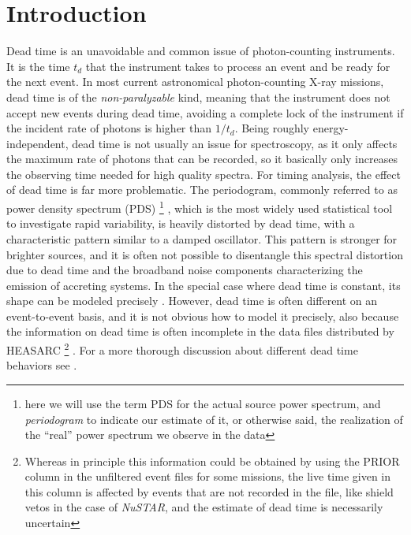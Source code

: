 \documentclass[twocolumn]{aastex61}
\newcommand{\project}[1]{\textsl{#1}}
\newcommand{\nustar}{\project{NuSTAR}\xspace}
\newcommand{\deadt}{\ensuremath{t_d}\xspace}
\begin{document}
\section{Introduction} \label{sec:intro}
Dead time is an unavoidable and common issue of photon-counting instruments.
It is the time $\deadt$ that the instrument takes to process an event and be ready for the next event.
In most current astronomical photon-counting X-ray missions, dead time is of the \textit{non-paralyzable} kind, meaning that the instrument does not accept new events during dead time, avoiding a complete lock of the instrument if the incident rate of photons is higher than $1/\deadt$.
Being roughly energy-independent, dead time is not usually an issue for spectroscopy, as it only affects the maximum rate of photons that can be recorded, so it basically only increases the observing time needed for high quality spectra.
For timing analysis, the effect of dead time is far more problematic.
The periodogram, commonly referred to as power density spectrum (PDS)%
\footnote{here we will use the term PDS for the actual source power spectrum, and \textit{periodogram} to indicate our estimate of it, or otherwise said, the realization of the ``real'' power spectrum we observe in the data}%
, which is the most widely used statistical tool to investigate rapid variability, is heavily distorted by dead time, with a characteristic pattern similar to a damped oscillator.
This pattern is stronger for brighter sources, and it is often not possible to disentangle this spectral distortion due to dead time and the broadband noise components characterizing the emission of accreting systems.
In the special case where dead time is constant, its shape can be modeled precisely \citep{Zhang+95,Vikhlinin+94}.
However, dead time is often different on an event-to-event basis, and it is not obvious how to model it precisely, also because the information on dead time is often incomplete in the data files distributed by HEASARC%
\footnote{Whereas in principle this information could be obtained by using the PRIOR column in the unfiltered event files for some missions, the live time given in this column is affected by events that are not recorded in the file, like shield vetos in the case of \nustar, and the estimate of dead time is necessarily uncertain}%
.
For a more thorough discussion about different dead time behaviors see \citet{Zhang+95}.
\end{document}
